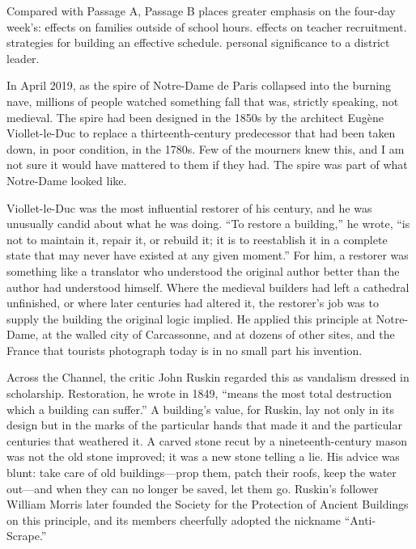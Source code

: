 \documentclass[11pt]{article}
\begin{document}
{Compared with Passage A, Passage B places greater emphasis on the four-day week's:}
{effects on families outside of school hours.}
{effects on teacher recruitment.}
{strategies for building an effective schedule.}
{personal significance to a district leader.}

\clearpage
{}
\begin{passage}
In April 2019, as the spire of Notre-Dame de Paris collapsed into the burning nave, millions of people watched something fall that was, strictly speaking, not medieval. The spire had been designed in the 1850s by the architect Eug\`ene Viollet-le-Duc to replace a thirteenth-century predecessor that had been taken down, in poor condition, in the 1780s. Few of the mourners knew this, and I am not sure it would have mattered to them if they had. The spire was part of what Notre-Dame looked like.

Viollet-le-Duc was the most influential restorer of his century, and he was unusually candid about what he was doing. ``To restore a building,'' he wrote, ``is not to maintain it, repair it, or rebuild it; it is to reestablish it in a complete state that may never have existed at any given moment.'' For him, a restorer was something like a translator who understood the original author better than the author had understood himself. Where the medieval builders had left a cathedral unfinished, or where later centuries had altered it, the restorer's job was to supply the building the original logic implied. He applied this principle at Notre-Dame, at the walled city of Carcassonne, and at dozens of other sites, and the France that tourists photograph today is in no small part his invention.

Across the Channel, the critic John Ruskin regarded this as vandalism dressed in scholarship. Restoration, he wrote in 1849, ``means the most total destruction which a building can suffer.'' A building's value, for Ruskin, lay not only in its design but in the marks of the particular hands that made it and the particular centuries that weathered it. A carved stone recut by a nineteenth-century mason was not the old stone improved; it was a new stone telling a lie. His advice was blunt: take care of old buildings---prop them, patch their roofs, keep the water out---and when they can no longer be saved, let them go. Ruskin's follower William Morris later founded the Society for the Protection of Ancient Buildings on this principle, and its members cheerfully adopted the nickname ``Anti-Scrape.''


\end{passage}
\end{document}
